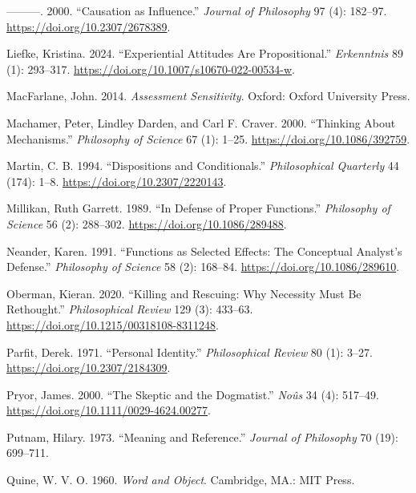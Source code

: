\documentclass[
  12pt,
  letterpaper,
  DIV=11,
  numbers=noendperiod]{scrartcl}
\newlength{\cslhangindent}
\newenvironment{CSLReferences}[2] %
 {\begin{list}{}{%
  \setlength{\itemindent}{0pt}
  \setlength{\leftmargin}{0pt}
  \setlength{\parsep}{0pt}
  \ifodd #1
   \setlength{\leftmargin}{\cslhangindent}
   \setlength{\itemindent}{-1\cslhangindent}
  \fi
  \setlength{\itemsep}{#2\baselineskip}}}
 {\end{list}}
\begin{document}
\begin{CSLReferences}{1}{0}
---------. 2000. {``Causation as Influence.''} \emph{Journal of
Philosophy} 97 (4): 182--97. \url{https://doi.org/10.2307/2678389}.

Liefke, Kristina. 2024. {``Experiential Attitudes Are Propositional.''}
\emph{Erkenntnis} 89 (1): 293--317.
\url{https://doi.org/10.1007/s10670-022-00534-w}.

MacFarlane, John. 2014. \emph{Assessment Sensitivity}. Oxford: Oxford
University Press.

Machamer, Peter, Lindley Darden, and Carl F. Craver. 2000. {``Thinking
About Mechanisms.''} \emph{Philosophy of Science} 67 (1): 1--25.
\url{https://doi.org/10.1086/392759}.

Martin, C. B. 1994. {``Dispositions and Conditionals.''}
\emph{Philosophical Quarterly} 44 (174): 1--8.
\url{https://doi.org/10.2307/2220143}.

Millikan, Ruth Garrett. 1989. {``In Defense of Proper Functions.''}
\emph{Philosophy of Science} 56 (2): 288--302.
\url{https://doi.org/10.1086/289488}.

Neander, Karen. 1991. {``Functions as Selected Effects: The Conceptual
Analyst's Defense.''} \emph{Philosophy of Science} 58 (2): 168--84.
\url{https://doi.org/10.1086/289610}.

Oberman, Kieran. 2020. {``Killing and Rescuing: Why Necessity Must Be
Rethought.''} \emph{Philosophical Review} 129 (3): 433--63.
\url{https://doi.org/10.1215/00318108-8311248}.

Parfit, Derek. 1971. {``Personal Identity.''} \emph{Philosophical
Review} 80 (1): 3--27. \url{https://doi.org/10.2307/2184309}.

Pryor, James. 2000. {``The Skeptic and the Dogmatist.''} \emph{Noûs} 34
(4): 517--49. \url{https://doi.org/10.1111/0029-4624.00277}.

Putnam, Hilary. 1973. {``Meaning and Reference.''} \emph{Journal of
Philosophy} 70 (19): 699--711.

Quine, W. V. O. 1960. \emph{Word and Object}. Cambridge, MA.: MIT Press.


\end{CSLReferences}
\end{document}

